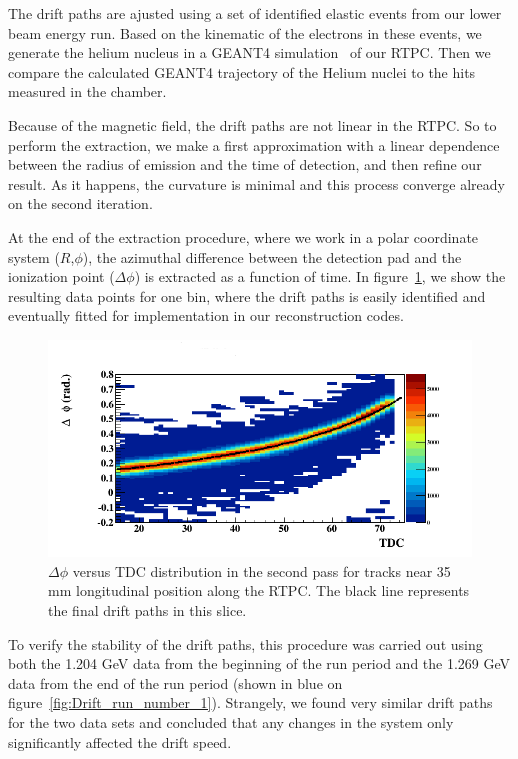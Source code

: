 \documentclass[twocolumn,showpacs,superscriptaddress,groupedaddress]{revtex4}
\begin{document}
The drift paths are ajusted using a set of identified elastic events 
from our lower beam energy run. Based on the kinematic of the electrons in
these events, we generate the helium nucleus in a GEANT4 
simulation~\cite{GEANT4} of our RTPC. Then we compare the calculated GEANT4 trajectory of 
the Helium nuclei to the hits measured in the chamber. 

Because of the 
magnetic field, the drift paths are not linear in the RTPC. So to perform the extraction, 
we make a first approximation with a linear dependence between the radius of 
emission and the time of detection, and then refine our result. As it happens, 
the curvature is minimal and this process converge already on the second 
iteration. 

At the end of the extraction procedure, where we work in a polar coordinate 
system ($R$,$\phi$), the azimuthal difference between the detection pad and 
the ionization point ($\Delta\phi$) is extracted as a function of time. 
In figure~\ref{fig:DELTA_PHI_TDC}, we show the resulting data points for one 
bin, where the drift paths is easily identified and eventually fitted for 
implementation in our reconstruction codes.

\begin{figure}[tb]
\centering
\includegraphics[scale=0.37]{fig/FitResult_p2_10.png}
\caption{$\Delta \phi$ versus TDC distribution in the second pass for tracks
near 35 mm longitudinal position along the RTPC. The black line represents 
the final drift paths in this slice.}
\label{fig:DELTA_PHI_TDC}
\end{figure}

To verify the stability of the drift paths, this procedure was carried out 
using both the 1.204 GeV data from the beginning of the run period and the 
1.269 GeV data from the end of the run period (shown in blue on 
figure~\ref{fig:Drift_run_number_1}). Strangely, we found very similar drift paths
for the two data sets and concluded that any changes in the system only
significantly affected the drift speed.
\end{document}
